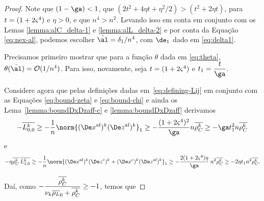 \begin{proof} Note que $(1-\ga)<1$, que $(2t^{2} + 4\eta t + \eta^{2}/2) >(  t^{2} + 2\eta t)$, para $t = (1+2\varsigma^{4})$ e $\eta>0$, e que $n^{4} > n^{2}$. Levando isso em conta em conjunto com os Lemas \ref{lemma:alC_delta-1} e \ref{lemma:alL_delta-2} e  por conta da Equação \eqref{eq:nex-al}, podemos escolher $\nextal = \delta_{1}/n^{4}$, com $\de_{1}$ dado em \eqref{eq:delta1}. 

Precisamos  primeiro mostrar que para a função $\theta$ dada em \eqref{eq:theta},  $\theta(\nextal)= \Oset(1/n^{4})$. Para isso, novamente, seja $t = (1+2\varsigma^{4})$ e $t_1 = \dfrac{t}{\ga}$.  

Considere agora que pelas definições  dadas em~\eqref{eq:defining-Lij} em conjunto com  as Equações  \eqref{eq:bound-zeta} e \eqref{eq:bound-chi} e ainda  os Lema~\ref{lemma:boundDxDzaff-c} e \ref{lemma:boundDxDzaff} derivamos 
\[
- \dbvec{L_{0,0}^{k}} \geq - \dfrac{1}{n} \norm{ \dekx  \dekz }_1 \geq - \dfrac{(1 + 2\bdxzstar^{4})^{2} }{\ga} n\rhoCkb \geq -\ga t_{1}^{2}n\rhoCkb
\]
e 
\[
- \eta\rhoCkb\,  \dbvec{L_{1,0}^{k}} \geq - \dfrac{1}{n} \norm{ \dekx \Dekcoz + \Dekcox \dekz }_1 \geq - \dfrac{2(1+2\bdxzstar^{4})\eta }{\ga}\: n^{2}\rhoCkb\geq - 2\eta t_{1} n^{2}\rhoCkb.
\]




Daí, como $-\dfrac{\overline{\rho_C^{k}} }{\nu_{k} \overline{\rho_L}_0 + \overline{\rho_C^{k}} }\geq - 1$, temos que




\end{proof}
